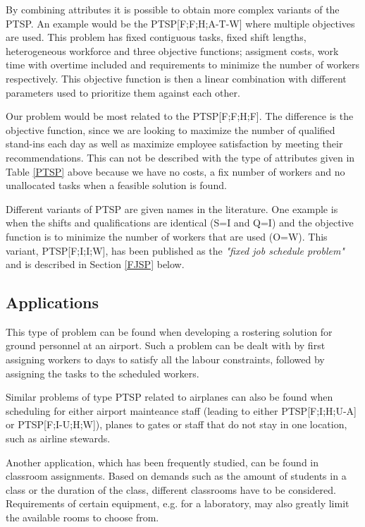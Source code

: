 By combining attributes it is possible to obtain more complex variants of the PTSP. An example would be the PTSP[F;F;H;A-T-W] where multiple objectives are used. This problem has fixed contiguous tasks, fixed shift lengths, heterogeneous workforce and three objective functions; assigment costs, work time with overtime included and requirements to minimize the number of workers respectively. This objective function is then a linear combination with different parameters used to prioritize them against each other.

Our problem would be most related to the PTSP[F;F;H;F]. The difference is the objective function, since we are looking to maximize the number of qualified stand-ins each day as well as maximize employee satisfaction by meeting their recommendations. This can not be described with the type of attributes given in Table \ref{PTSP} above because we have no costs, a fix number of workers and no unallocated tasks when a feasible solution is found. 

Different variants of PTSP are given names in the literature. One example is when the shifts and qualifications are identical (S=I and Q=I) and the objective function is to minimize the number of workers that are used (O=W). This variant, PTSP[F;I;I;W], has been published as the \textit{"fixed job schedule problem"} and is described in Section \ref{FJSP} below.

\subsection{Applications}
This type of problem can be found when developing a rostering solution for ground personnel at an airport. Such a problem can be dealt with by first assigning workers to days to satisfy all the labour constraints, followed by assigning the tasks to the scheduled workers.

Similar problems of type PTSP related to airplanes can also be found when scheduling for either airport mainteance staff (leading to either PTSP[F;I;H;U-A] or PTSP[F;I-U;H;W]), planes to gates or staff that do not stay in one location, such as airline stewards. 

Another application, which has been frequently studied, can be found in classroom assignments. Based on demands such as the amount of students in a class or the duration of the class, different classrooms have to be considered. Requirements of certain equipment, e.g. for a laboratory, may also greatly limit the available rooms to choose from.

